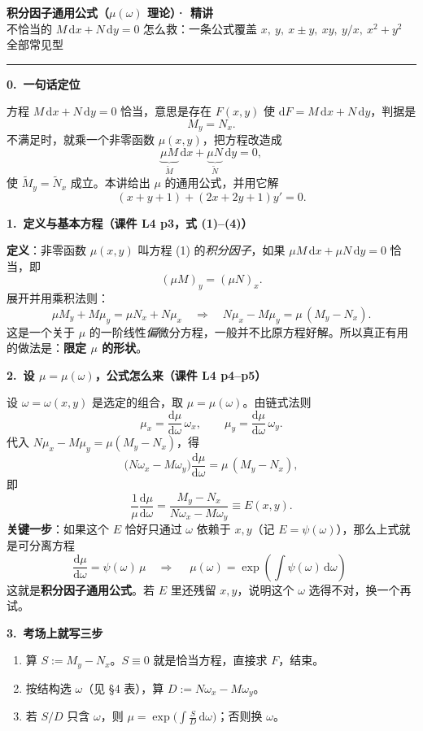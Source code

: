 \documentclass[11pt,a4paper]{ctexart}
\newcommand{\dd}{\mathrm{d}}
\begin{document}
{\color{mainblue}\Large\bfseries 积分因子通用公式（$\mu(\omega)$ 理论）· 精讲}\\[3pt]
{\color{mainblue}\small 不恰当的 $M\,\dd x+N\,\dd y=0$ 怎么救：一条公式覆盖 $x,\ y,\ x\pm y,\ xy,\ y/x,\ x^{2}+y^{2}$ 全部常见型}

\vspace{0.3em}
\noindent\rule{\linewidth}{0.6pt}

\textbf{0.\ 一句话定位}

方程 $M\,\dd x+N\,\dd y=0$ 恰当，意思是存在 $F(x,y)$ 使 $\dd F=M\,\dd x+N\,\dd y$，判据是
\[
M_y=N_x .
\]
不满足时，就乘一个非零函数 $\mu(x,y)$，把方程改造成
\[
\underbrace{\mu M}_{\tilde M}\,\dd x+\underbrace{\mu N}_{\tilde N}\,\dd y=0,
\]
使 $\tilde M_y=\tilde N_x$ 成立。本讲给出 $\mu$ 的通用公式，并用它解
\[
(x+y+1)+(2x+2y+1)y'=0 .
\]

\textbf{1.\ 定义与基本方程（课件 L4 p3，式 (1)--(4)）}

\textbf{定义}：非零函数 $\mu(x,y)$ 叫方程 (1) 的\emph{积分因子}，如果 $\mu M\,\dd x+\mu N\,\dd y=0$ 恰当，即
\[
(\mu M)_y=(\mu N)_x .
\]
展开并用乘积法则：
\[
\mu M_y+M\mu_y=\mu N_x+N\mu_x
\quad\Longrightarrow\quad
N\mu_x-M\mu_y=\mu\,(M_y-N_x).
\]
这是一个关于 $\mu$ 的一阶线性\emph{偏}微分方程，一般并不比原方程好解。所以真正有用的做法是：\textbf{限定 $\mu$ 的形状}。

\textbf{2.\ 设 $\mu=\mu(\omega)$，公式怎么来（课件 L4 p4--p5）}

设 $\omega=\omega(x,y)$ 是选定的组合，取 $\mu=\mu(\omega)$。由链式法则
\[
\mu_x=\frac{\dd\mu}{\dd\omega}\,\omega_x,\qquad
\mu_y=\frac{\dd\mu}{\dd\omega}\,\omega_y .
\]
代入 $N\mu_x-M\mu_y=\mu(M_y-N_x)$，得
\[
\bigl(N\omega_x-M\omega_y\bigr)\frac{\dd\mu}{\dd\omega}=\mu\,(M_y-N_x),
\]
即
\[
\frac{1}{\mu}\frac{\dd\mu}{\dd\omega}
=\frac{M_y-N_x}{N\omega_x-M\omega_y}
\equiv E(x,y).
\]
\textbf{关键一步}：如果这个 $E$ 恰好只通过 $\omega$ 依赖于 $x,y$（记 $E=\psi(\omega)$），那么上式就是可分离方程
\[
\frac{\dd\mu}{\dd\omega}=\psi(\omega)\,\mu
\quad\Longrightarrow\quad
\boxed{\;\mu(\omega)=\exp\!\left(\int\psi(\omega)\,\dd\omega\right)\;}
\]
这就是\textbf{积分因子通用公式}。若 $E$ 里还残留 $x,y$，说明这个 $\omega$ 选得不对，换一个再试。

\textbf{3.\ 考场上就写三步}

\begin{enumerate}
\item 算 $S:=M_y-N_x$。$S\equiv 0$ 就是恰当方程，直接求 $F$，结束。
\item 按结构选 $\omega$（见 §4 表），算 $D:=N\omega_x-M\omega_y$。
\item 若 $S/D$ 只含 $\omega$，则 $\mu=\exp\!\bigl(\int \frac{S}{D}\,\dd\omega\bigr)$；否则换 $\omega$。
\end{enumerate}
\end{document}
